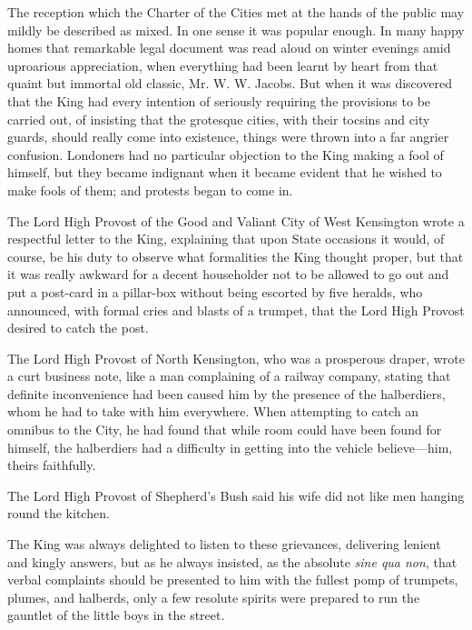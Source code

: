 \documentclass{book}
\begin{document}
The reception which the Charter of the Cities met at the hands of the public may mildly be described as mixed. In one sense it was popular enough. In many happy homes that remarkable legal document was read aloud on winter evenings amid uproarious appreciation, when everything had been learnt by heart from that quaint but immortal old classic, Mr. W. W. Jacobs. But when it was discovered that the King had every intention of seriously requiring the provisions to be carried out, of insisting that the grotesque cities, with their tocsins and city guards, should really come into existence, things were thrown into a far angrier confusion. Londoners had no particular objection to the King making a fool of himself, but they became indignant when it became evident that he wished to make fools of them; and protests began to come in.

The Lord High Provost of the Good and Valiant City of West Kensington wrote a respectful letter to the King, explaining that upon State occasions it would, of course, be his duty to observe what formalities the King thought proper, but that it was really awkward for a decent householder not to be allowed to go out and put a post-card in a pillar-box without being escorted by five heralds, who announced, with formal cries and blasts of a trumpet, that the Lord High Provost desired to catch the post.

The Lord High Provost of North Kensington, who was a prosperous draper, wrote a curt business note, like a man complaining of a railway company, stating that definite inconvenience had been caused him by the presence of the halberdiers, whom he had to take with him everywhere. When attempting to catch an omnibus to the City, he had found that while room could have been found for himself, the halberdiers had a difficulty in getting into the vehicle believe—him, theirs faithfully.

The Lord High Provost of Shepherd’s Bush said his wife did not like men hanging round the kitchen.

The King was always delighted to listen to these grievances, delivering lenient and kingly answers, but as he always insisted, as the absolute \emph{sine qua non}, that verbal complaints should be presented to him with the fullest pomp of trumpets, plumes, and halberds, only a few resolute spirits were prepared to run the gauntlet of the little boys in the street.
\end{document}
